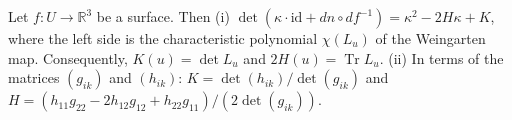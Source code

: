 Let $f: U \to \mathbb{R}^3$ be a surface. Then
(i) $\det(\kappa \cdot \mathrm{id} + dn \circ df^{-1}) = \kappa^2 - 2H\kappa + K$, where the left side is the characteristic polynomial $\chi(L_u)$ of the Weingarten map. Consequently, $K(u) = \det L_u$ and $2H(u) = \operatorname{Tr} L_u$.
(ii) In terms of the matrices $(g_{ik})$ and $(h_{ik})$: $K = \det(h_{ik})/\det(g_{ik})$ and $H = (h_{11}g_{22} - 2h_{12}g_{12} + h_{22}g_{11})/(2\det(g_{ik}))$.